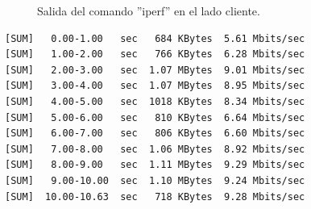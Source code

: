 \begin{figure}[H]
    \centering
    \hspace{1.5cm}
    \caption{Salida del comando ''iperf'' en el lado cliente.}
\end{figure}

\begin{lstlisting}[caption={Salida del comando ''iperf'' en el lado servidor.}]
[SUM]   0.00-1.00   sec   684 KBytes  5.61 Mbits/sec 
[SUM]   1.00-2.00   sec   766 KBytes  6.28 Mbits/sec 
[SUM]   2.00-3.00   sec  1.07 MBytes  9.01 Mbits/sec     
[SUM]   3.00-4.00   sec  1.07 MBytes  8.95 Mbits/sec 
[SUM]   4.00-5.00   sec  1018 KBytes  8.34 Mbits/sec 
[SUM]   5.00-6.00   sec   810 KBytes  6.64 Mbits/sec 
[SUM]   6.00-7.00   sec   806 KBytes  6.60 Mbits/sec
[SUM]   7.00-8.00   sec  1.06 MBytes  8.92 Mbits/sec 
[SUM]   8.00-9.00   sec  1.11 MBytes  9.29 Mbits/sec  
[SUM]   9.00-10.00  sec  1.10 MBytes  9.24 Mbits/sec 
[SUM]  10.00-10.63  sec   718 KBytes  9.28 Mbits/sec 
\end{lstlisting}

